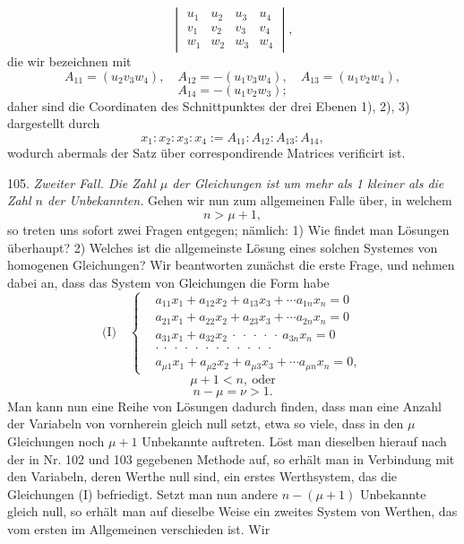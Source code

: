 \[
\begin{vmatrix}
u_1 & u_2 & u_3 & u_4 \\
v_1 & v_2 & v_3 & v_4 \\
w_1 & w_2 & w_3 & w_4
\end{vmatrix},
\]
die wir bezeichnen mit
\[ A_{11}=(u_2v_3w_4), \quad A_{12}=-(u_1v_3w_4), \quad A_{13}=(u_1v_2w_4), \]
\[ A_{14}=-(u_1v_2w_3); \]
daher sind die Coordinaten des Schnittpunktes der drei Ebenen 1), 2), 3) dargestellt durch
\[ x_1:x_2:x_3:x_4:=A_{11}:A_{12}:A_{13}:A_{14}, \]
wodurch abermals der Satz über correspondirende Matrices verificirt ist.

105. \textit{Zweiter Fall. Die Zahl $\mu$ der Gleichungen ist um mehr als 1 kleiner als die Zahl $n$ der Unbekannten.} Gehen wir nun zum allgemeinen Falle über, in welchem
\[ n > \mu + 1, \]
so treten uns sofort zwei Fragen entgegen; nämlich: 1) Wie findet man Lösungen überhaupt? 2) Welches ist die allgemeinste Lösung eines solchen Systemes von homogenen Gleichungen? Wir beantworten zunächst die erste Frage, und nehmen dabei an, dass das System von Gleichungen die Form habe
\[
\text{(I)}\quad
\left\{
\begin{aligned}
&a_{11}x_1+a_{12}x_2+a_{13}x_3+\cdots a_{1n}x_n=0 \\
&a_{21}x_1+a_{22}x_2+a_{23}x_3+\cdots a_{2n}x_n=0 \\
&a_{31}x_1+a_{32}x_2\ \cdot\ \cdot\ \cdot\ \cdot\ \cdot\ a_{3n}x_n=0 \\
&\cdot\ \cdot\ \cdot\ \cdot\ \cdot\ \cdot\ \cdot\ \cdot\ \cdot\ \cdot\ \cdot\ \cdot \\
&a_{\mu1}x_1+a_{\mu2}x_2+a_{\mu3}x_3+\cdots a_{\mu n}x_n=0,
\end{aligned}
\right.
\]
\[ \mu+1<n, \ \text{oder} \]
\[ n-\mu=\nu>1. \]
Man kann nun eine Reihe von Lösungen dadurch finden, dass man eine Anzahl der Variabeln von vornherein gleich null setzt, etwa so viele, dass in den $\mu$ Gleichungen noch $\mu+1$ Unbekannte auftreten. Löst man dieselben hierauf nach der in Nr. 102 und 103 gegebenen Methode auf, so erhält man in Verbindung mit den Variabeln, deren Werthe null sind, ein erstes Werthsystem, das die Gleichungen (I) befriedigt. Setzt man nun andere $n-(\mu+1)$ Unbekannte gleich null, so erhält man auf dieselbe Weise ein zweites System von Werthen, das vom ersten im Allgemeinen verschieden ist. Wir


